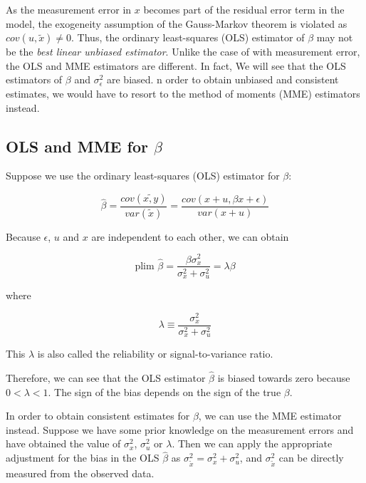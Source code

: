 \documentclass{article}
\begin{document}
As the measurement error in $x$ becomes part of the residual error term in the model, the exogeneity assumption of the Gauss-Markov theorem is violated as $cov(u, \tilde{x}) \neq 0$.
Thus, the ordinary least-squares (OLS) estimator of $\beta$ may not be the \textit{best linear unbiased estimator}.
Unlike the case of with measurement error, the OLS and MME estimators are different.
In fact, We will see that the OLS estimators of $\beta$ and $\sigma_\epsilon^2$ are biased. 
n order to obtain unbiased and consistent estimates, we would have to resort to the method of moments (MME) estimators instead. 

\subsection{OLS and MME for $\beta$}

Suppose we use the ordinary least-squares (OLS) estimator for $\beta$:

\begin{equation}
\hat{\beta} = \frac{cov(\tilde{x, y})}{var(\tilde{x})} = \frac{cov(x+u, \beta x + \epsilon)}{var(x + u)}
\end{equation}

Because $\epsilon$, $u$ and $x$ are independent to each other, we can obtain

\begin{equation}
\textrm{plim } \hat{\beta} = \frac{\beta \sigma^2_x}{\sigma^2_x + \sigma^2_u} = \lambda \beta
\end{equation}

where

\begin{equation}
\lambda \equiv \frac{\sigma_x^2}{\sigma_x^2 + \sigma_u^2}
\end{equation}

This $\lambda$ is also called the reliability or signal-to-variance ratio.

Therefore, we can see that the OLS estimator $\hat{\beta}$ is biased towards zero because $0 < \lambda < 1$. The sign of the bias depends on the sign of the true $\beta$.

In order to obtain consistent estimates for $\beta$, we can use the MME estimator instead.
Suppose we have some prior knowledge on the measurement errors and have obtained the value of $\sigma_x^2$, $\sigma_u^2$ or $\lambda$.
Then we can apply the appropriate adjustment for the bias in the OLS $\hat{\beta}$ as $\sigma^2_{\tilde{x}} = \sigma^2_x + \sigma^2_u$, and $\sigma^2_{\tilde{x}}$ can be directly measured from the observed data. 
\end{document}
